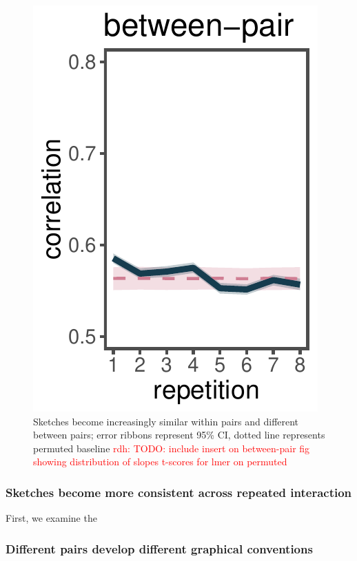 \documentclass[10pt,letterpaper]{article}
\newcommand{\rdh}[1]{\textcolor{Red}{rdh: #1}}
\begin{document}
\begin{figure}
\includegraphics[width=\linewidth/2-1]{figures/across.pdf}
\caption{Sketches become increasingly similar within pairs and different between pairs; error ribbons represent 95\% CI, dotted line represents permuted baseline \rdh{TODO: include insert on between-pair fig showing distribution of slopes t-scores for lmer on permuted}} \label{within-across}
\end{figure}


\subsubsection{Sketches become more consistent across repeated interaction}

First, we examine the 

\subsubsection{Different pairs develop different graphical conventions} 
\end{document}
